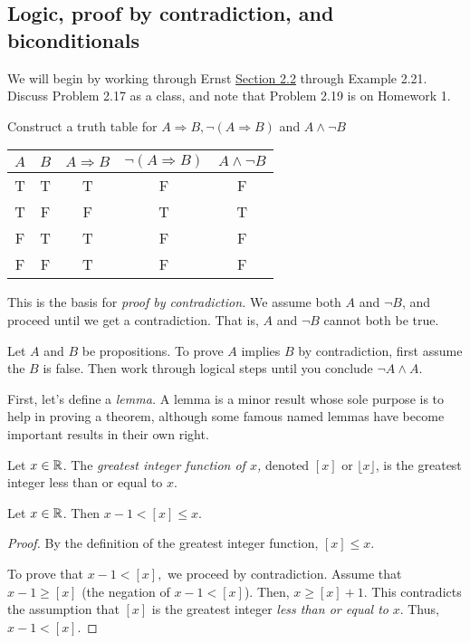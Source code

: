 \documentclass{ximera}
\begin{document}
\subsection{Logic, proof by contradiction, and biconditionals}%

We will begin by working through Ernst \href{https://danaernst.com/IBL-IntroToProof/pretext/sec_Intro_to_Logic.html}{Section 2.2} through Example 2.21. Discuss Problem 2.17 as a class, and note that Problem 2.19 is on Homework 1.



\begin{br}
 Construct a truth table for $A\Rightarrow B, \neg (A\Rightarrow B)$ and $A\land \neg B$
\end{br}
\begin{solution}
 
\begin{tabular}{c|c|c|c|c}
 $A$ 	& $B$	& $A\Rightarrow B$ 	& $\neg (A\Rightarrow B)$ & $A\land \neg B$\\\hline
  T 	& T		& T 				& F					& F	\\
  T 	& F 		& F 				& T					& T\\
  F 	& T 		& T 				& F					& F\\
  F 	& F 		& T 				& F					& F\\
\end{tabular}
\end{solution}

This is the basis for \emph{proof by contradiction.} We assume both $A$ and $\neg B$, and proceed until we get a contradiction. That is, $A$ and $\neg B$ cannot both be true.

\begin{defn}
 Let $A$ and $B$ be propositions. To prove $A$ implies $B$ by contradiction, first assume the $B$ is false. Then work through logical steps until you conclude $\neg A \land A$.
\end{defn}

First, let's define a \emph{lemma.} A lemma is a minor result whose sole purpose is to help in proving a theorem, although some famous named lemmas have become important results in their own right.

\begin{defn}
 Let $x\in\mathbb R$. The \emph{greatest integer function of $x$,} denoted $[x]$ or $\lfloor x \rfloor$, is the greatest integer less than or equal to $x$.
\end{defn}
\begin{lem}
 Let $x\in\mathbb R$. Then $x-1<[x]\leq x$.
\end{lem}
\begin{proof}
By the definition of the greatest integer function, $[x]\leq x$. 

To prove that $x-1<[x],$ we proceed by contradiction. Assume that $x-1\geq [x]$ (the negation of $x-1<[x]$). Then, $x\geq [x]+1$. This contradicts the assumption that $[x]$ is the greatest integer \emph{less than or equal to} $x$. Thus, $x-1<[x].$
\end{proof}
\end{document}
